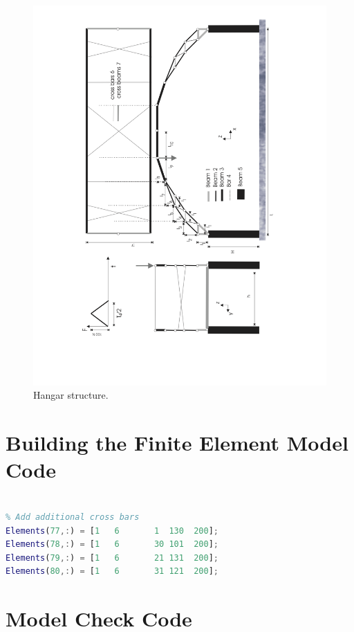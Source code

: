 \documentclass[AMdocument,optEnglish]{AMlatex}  %
\begin{document}
\begin{figure}[!htb] 
	\centering
	\includegraphics[width=\textwidth,height=\textheight,keepaspectratio]{hangar}
	\caption{Hangar structure.}
\end{figure}

\section{Building the Finite Element Model Code}
\label{sec:app-addtional-bars}

\begin{lstlisting}[language=Matlab]
%% Model elements

% Add additional cross bars
Elements(77,:) = [1   6       1  130  200];
Elements(78,:) = [1   6       30 101  200];
Elements(79,:) = [1   6       21 131  200];
Elements(80,:) = [1   6       31 121  200];
\end{lstlisting}

\section{Model Check Code}
\label{sec:app-modelcheck}
\end{document}
